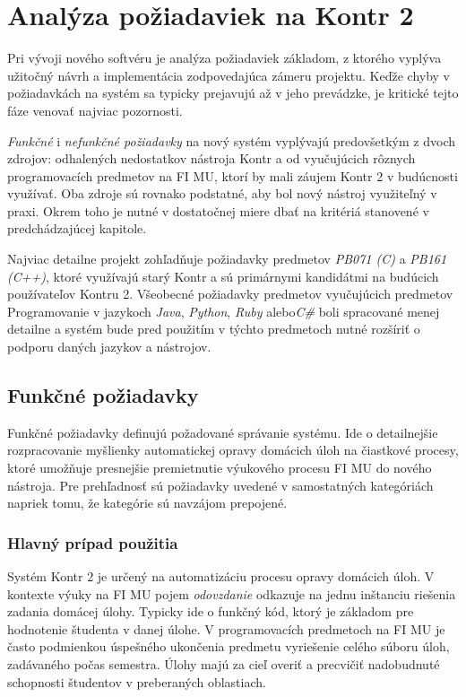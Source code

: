 \documentclass[
  digital, %
  oneside, %
  table,   %
  lof,     %
  lot,   %
]{fithesis3}
\begin{document}
\chapter{Analýza požiadaviek na Kontr 2}

Pri vývoji nového softvéru je analýza požiadaviek základom, z ktorého vyplýva užitočný návrh a implementácia zodpovedajúca zámeru projektu. Keďže chyby v požiadavkách na systém sa typicky prejavujú až v jeho prevádzke, je kritické tejto fáze venovať najviac pozornosti. 

\emph{Funkčné} i \emph{nefunkčné požiadavky} na nový systém vyplývajú predovšetkým z dvoch zdrojov: odhalených nedostatkov nástroja Kontr a od vyučujúcich rôznych programovacích predmetov na FI MU, ktorí by mali záujem Kontr 2 v budúcnosti využívať. Oba zdroje sú rovnako podstatné, aby bol nový nástroj využiteľný v praxi. Okrem toho je nutné v dostatočnej miere dbať na kritériá stanovené v predchádzajúcej kapitole.

Najviac detailne projekt zohľadňuje požiadavky predmetov \emph{PB071 (C)} a \emph{PB161 (C++)}, ktoré využívajú starý Kontr a sú primárnymi kandidátmi na budúcich používateľov Kontru 2. Všeobecné požiadavky predmetov vyučujúcich predmetov Programovanie v jazykoch \emph{Java}, \emph{Python}, \emph{Ruby} alebo\emph{C\#} boli spracované menej detailne a systém bude pred použitím v týchto predmetoch nutné rozšíriť o podporu daných jazykov a nástrojov. 

\section{Funkčné požiadavky}

Funkčné požiadavky definujú požadované správanie systému. Ide o detailnejšie rozpracovanie myšlienky automatickej opravy domácich úloh na čiastkové procesy, ktoré umožňuje presnejšie premietnutie výukového procesu FI MU do nového nástroja. Pre prehľadnosť sú požiadavky uvedené v samostatných kategóriách napriek tomu, že kategórie sú navzájom prepojené.

\subsection{Hlavný prípad použitia}

Systém Kontr 2 je určený na automatizáciu procesu opravy domácich úloh. V kontexte výuky na FI MU pojem \textit{odovzdanie} odkazuje na jednu inštanciu riešenia zadania domácej úlohy. Typicky ide o funkčný kód, ktorý je základom pre hodnotenie študenta v danej úlohe. V programovacích predmetoch na FI MU je často podmienkou úspešného ukončenia predmetu vyriešenie celého súboru úloh, zadávaného počas semestra. Úlohy majú za cieľ overiť a precvičiť nadobudnuté schopnosti študentov v preberaných oblastiach. 
\end{document}
